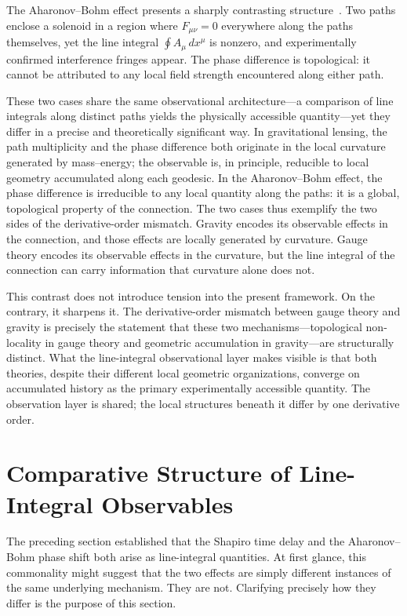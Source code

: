 \documentclass[12pt,letterpaper]{article}
\begin{document}
The Aharonov--Bohm effect presents a sharply contrasting structure~\cite{AharonovBohm1959}. Two paths enclose a solenoid in a region where $F_{\mu\nu} = 0$ everywhere along the paths themselves, yet the line integral $\oint A_\mu\, dx^\mu$ is nonzero, and experimentally confirmed interference fringes appear. The phase difference is topological: it cannot be attributed to any local field strength encountered along either path.

These two cases share the same observational architecture---a comparison of line integrals along distinct paths yields the physically accessible quantity---yet they differ in a precise and theoretically significant way. In gravitational lensing, the path multiplicity and the phase difference both originate in the local curvature generated by mass--energy; the observable is, in principle, reducible to local geometry accumulated along each geodesic. In the Aharonov--Bohm effect, the phase difference is irreducible to any local quantity along the paths: it is a global, topological property of the connection. The two cases thus exemplify the two sides of the derivative-order mismatch. Gravity encodes its observable effects in the connection, and those effects are locally generated by curvature. Gauge theory encodes its observable effects in the curvature, but the line integral of the connection can carry information that curvature alone does not.

This contrast does not introduce tension into the present framework. On the contrary, it sharpens it. The derivative-order mismatch between gauge theory and gravity is precisely the statement that these two mechanisms---topological non-locality in gauge theory and geometric accumulation in gravity---are structurally distinct. What the line-integral observational layer makes visible is that both theories, despite their different local geometric organizations, converge on accumulated history as the primary experimentally accessible quantity. The observation layer is shared; the local structures beneath it differ by one derivative order.

\section{Comparative Structure of Line-Integral Observables}

\justifying
The preceding section established that the Shapiro time delay and the Aharonov--Bohm phase shift both arise as line-integral quantities. At first glance, this commonality might suggest that the two effects are simply different instances of the same underlying mechanism. They are not. Clarifying precisely how they differ is the purpose of this section.
\end{document}
